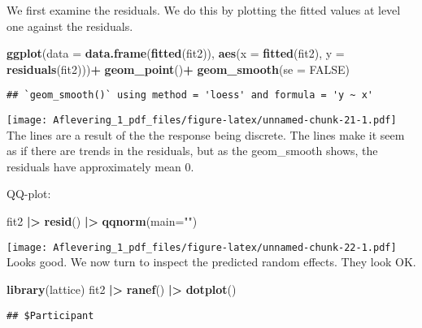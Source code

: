 \documentclass[
]{article}
\newenvironment{Shaded}{\begin{snugshade}}{\end{snugshade}}
\newcommand{\AttributeTok}[1]{\textcolor[rgb]{0.13,0.29,0.53}{#1}}
\newcommand{\ConstantTok}[1]{\textcolor[rgb]{0.56,0.35,0.01}{#1}}
\newcommand{\FunctionTok}[1]{\textcolor[rgb]{0.13,0.29,0.53}{\textbf{#1}}}
\newcommand{\NormalTok}[1]{#1}
\newcommand{\SpecialCharTok}[1]{\textcolor[rgb]{0.81,0.36,0.00}{\textbf{#1}}}
\newcommand{\StringTok}[1]{\textcolor[rgb]{0.31,0.60,0.02}{#1}}
\begin{document}
We first examine the residuals. We do this by plotting the fitted values
at level one against the residuals.

\begin{Shaded}
\begin{Highlighting}[]
\FunctionTok{ggplot}\NormalTok{(}\AttributeTok{data =} \FunctionTok{data.frame}\NormalTok{(}\FunctionTok{fitted}\NormalTok{(fit2)), }\FunctionTok{aes}\NormalTok{(}\AttributeTok{x =} \FunctionTok{fitted}\NormalTok{(fit2), }\AttributeTok{y =} \FunctionTok{residuals}\NormalTok{(fit2)))}\SpecialCharTok{+}
  \FunctionTok{geom\_point}\NormalTok{()}\SpecialCharTok{+}
  \FunctionTok{geom\_smooth}\NormalTok{(}\AttributeTok{se =} \ConstantTok{FALSE}\NormalTok{)}
\end{Highlighting}
\end{Shaded}

\begin{verbatim}
## `geom_smooth()` using method = 'loess' and formula = 'y ~ x'
\end{verbatim}

\texttt{[image: Aflevering\_1\_pdf\_files/figure-latex/unnamed-chunk-21-1.pdf]}
The lines are a result of the the response being discrete. The lines
make it seem as if there are trends in the residuals, but as the
geom\_smooth shows, the residuals have approximately mean \(0\).

QQ-plot:

\begin{Shaded}
\begin{Highlighting}[]
\NormalTok{fit2 }\SpecialCharTok{|\textgreater{}} \FunctionTok{resid}\NormalTok{() }\SpecialCharTok{|\textgreater{}} \FunctionTok{qqnorm}\NormalTok{(}\AttributeTok{main=}\StringTok{""}\NormalTok{)}
\end{Highlighting}
\end{Shaded}

\texttt{[image: Aflevering\_1\_pdf\_files/figure-latex/unnamed-chunk-22-1.pdf]}
Looks good. We now turn to inspect the predicted random effects. They
look OK.

\begin{Shaded}
\begin{Highlighting}[]
\FunctionTok{library}\NormalTok{(lattice)}
\NormalTok{fit2 }\SpecialCharTok{|\textgreater{}} \FunctionTok{ranef}\NormalTok{() }\SpecialCharTok{|\textgreater{}} \FunctionTok{dotplot}\NormalTok{()}
\end{Highlighting}
\end{Shaded}

\begin{verbatim}
## $Participant
\end{verbatim}
\end{document}

